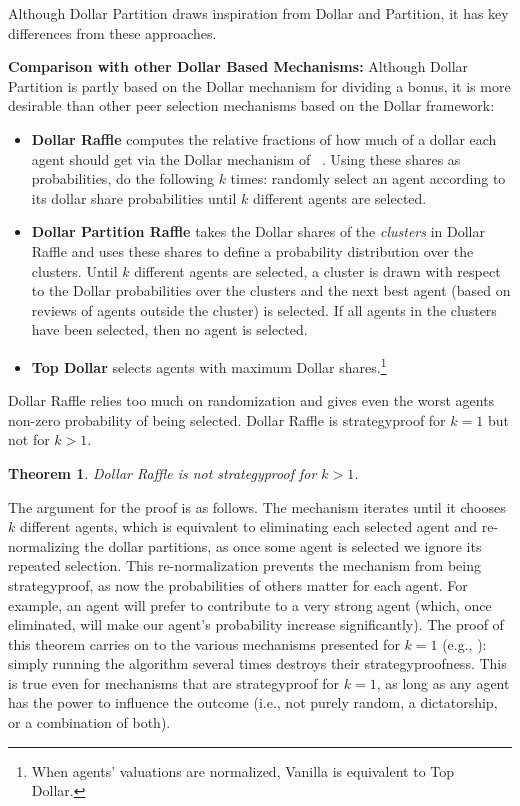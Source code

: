 \documentclass[letterpaper]{article}
\newtheorem{theorem}{Theorem}
\newcommand{\citet}[1]{\citeauthor{#1}~\shortcite{#1}}
\begin{document}
Although Dollar Partition draws inspiration from Dollar and Partition, it has key differences from these approaches.


\smallskip
\noindent
\textbf{Comparison with other Dollar Based Mechanisms:}\;
Although Dollar Partition is partly based on the Dollar mechanism for dividing a bonus, it is more desirable than other peer selection mechanisms based on the Dollar framework:
\begin{itemize}[leftmargin=*]
\setlength\itemsep{0em}
\item \textbf{Dollar Raffle} computes the relative fractions of how much of a dollar each agent should get via the Dollar mechanism of \citet{CMT08a}. Using these shares as probabilities, do the following $k$ times: randomly select an agent according to its dollar share probabilities until $k$ different agents are selected.
\item \textbf{Dollar Partition Raffle} takes the Dollar shares of the \emph{clusters} in Dollar Raffle and uses these shares to define a probability distribution over the clusters. Until $k$ different agents are selected, a cluster is drawn with respect to the Dollar probabilities over the clusters and the next best agent (based on reviews of agents outside the cluster) is selected. If all agents in the clusters have been selected, then no agent is selected.
\item \textbf{Top Dollar} selects agents with maximum Dollar shares.\footnote{When agents' valuations are normalized, Vanilla is equivalent to Top Dollar.}
\end{itemize}

Dollar Raffle relies too much on randomization and gives even the worst agents non-zero probability of being selected. Dollar Raffle is strategyproof for $k=1$ but not for $k>1$.

\begin{theorem}
Dollar Raffle is not strategyproof for $k>1$.
\end{theorem}
The argument for the proof is as follows. The mechanism iterates until it chooses $k$ different agents, which is equivalent to eliminating each selected agent and re-normalizing the dollar partitions, as once some agent is selected we ignore its repeated selection. This re-normalization prevents the mechanism from being strategyproof, as now the probabilities of others matter for each agent. For example, an agent will prefer to contribute to a very strong agent (which, once eliminated, will make our agent's probability increase significantly).
The proof of this theorem carries on to the various mechanisms presented for $k=1$ (e.g., \cite{FeKl14a}): simply running the algorithm several times destroys their strategyproofness. This is true even for mechanisms that are strategyproof for $k=1$, as long as any agent has the power to influence the outcome (i.e., not purely random, a dictatorship, or a combination of both).
\end{document}

